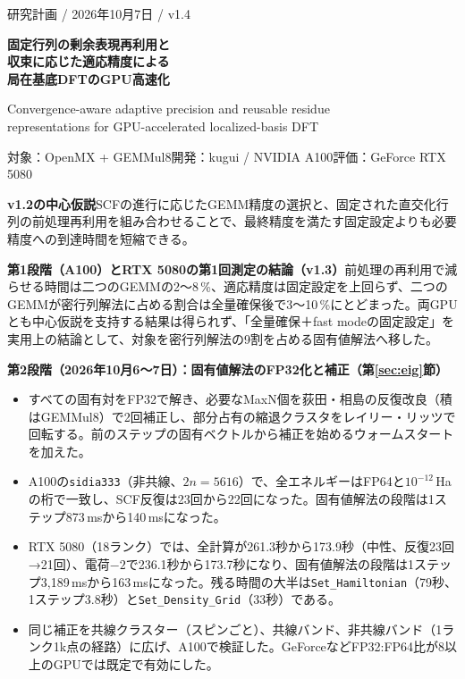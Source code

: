 \documentclass[a4paper,11pt]{ltjsarticle}
\newcommand{\code}[1]{\texttt{#1}}
\begin{document}
\begin{center}
{\small\sffamily\color{Ink} 研究計画 / 2026年10月7日 / v1.4}\par\vspace{3mm}
{\LARGE\bfseries 固定行列の剰余表現再利用と\\[2mm]
収束に応じた適応精度による\\[2mm]
局在基底DFTのGPU高速化}\par\vspace{3mm}
{\normalsize Convergence-aware adaptive precision and reusable residue\\
representations for GPU-accelerated localized-basis DFT}\par\vspace{2mm}
{\small 対象：OpenMX + GEMMul8\quad 開発：kugui / NVIDIA A100\quad 評価：GeForce RTX 5080}
\end{center}

\begin{keybox}
\textbf{v1.2の中心仮説}\quad SCFの進行に応じたGEMM精度の選択と、固定された直交化行列の前処理再利用を組み合わせることで、最終精度を満たす固定設定よりも必要精度への到達時間を短縮できる。

\medskip
\textbf{第1段階（A100）とRTX 5080の第1回測定の結論（v1.3）}\quad 前処理の再利用で減らせる時間は二つのGEMMの2〜8\,\%、適応精度は固定設定を上回らず、二つのGEMMが密行列解法に占める割合は全量確保後で3〜10\,\%にとどまった。両GPUとも中心仮説を支持する結果は得られず、「全量確保＋fast modeの固定設定」を実用上の結論として、対象を密行列解法の9割を占める固有値解法へ移した。

\medskip
\textbf{第2段階（2026年10月6〜7日）：固有値解法のFP32化と補正（第\ref{sec:eig}節）}
\begin{itemize}
\item すべての固有対をFP32で解き、必要なMaxN個を荻田・相島の反復改良（積はGEMMul8）で2回補正し、部分占有の縮退クラスタをレイリー・リッツで回転する。前のステップの固有ベクトルから補正を始めるウォームスタートを加えた。
\item A100の\code{sidia333}（非共線、$2n=5616$）で、全エネルギーはFP64と$10^{-12}$\,Haの桁で一致し、SCF反復は23回から22回になった。固有値解法の段階は1ステップ873\,msから140\,msになった。
\item RTX 5080（18ランク）では、全計算が261.3秒から173.9秒（中性、反復23回→21回）、電荷$-2$で236.1秒から173.7秒になり、固有値解法の段階は1ステップ3,189\,msから163\,msになった。残る時間の大半は\code{Set\_Hamiltonian}（79秒、1ステップ3.8秒）と\code{Set\_Density\_Grid}（33秒）である。
\item 同じ補正を共線クラスター（スピンごと）、共線バンド、非共線バンド（1ランク1k点の経路）に広げ、A100で検証した。GeForceなどFP32:FP64比が8以上のGPUでは既定で有効にした。
\end{itemize}
\end{keybox}
\end{document}
